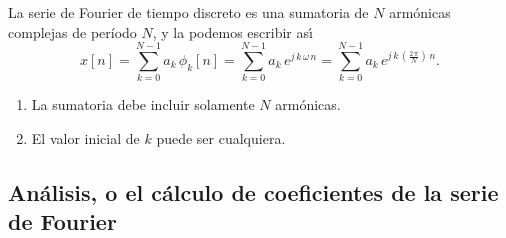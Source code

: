 La serie de Fourier de tiempo discreto es una sumatoria de $N$ arm\'{o}nicas complejas de per\'{i}odo $N$, y la podemos escribir as\'{\i}
\begin{equation}
x\left[ n\right] =
\sum_{k=0}^{N-1}a_{k} \, \phi _{k}\left[ n\right]
=
\sum_{k=0}^{N-1}a_{k} \, e^{j \, k \, \omega \, n}
=
\sum_{k=0}^{N-1}a_{k} \, e^{j \, k \, \left( \frac{2 \, \pi }{N}\right) \, n}.
\end{equation}
\begin{enumerate}
\item La sumatoria debe incluir solamente $N$ arm\'{o}nicas. 
\item El valor inicial de $k$ puede ser cualquiera.
\end{enumerate}

\subsection{Análisis, o el cálculo de coeficientes de la serie de Fourier}

